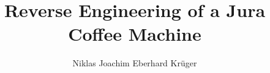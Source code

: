 \documentclass[de,acknowledgment,declaration,abstract,symbollist,inputenc=utf8]{tuhhthesis}
\author{Niklas Joachim Eberhard Krüger}
\title{Reverse Engineering of a Jura Coffee Machine}
\institute{InstTelematics}
\begin{document}









\begin{tuhhappendix}
  
\end{tuhhappendix}


\end{document}
